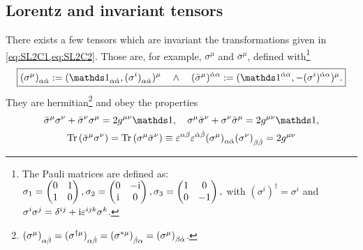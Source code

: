 \subsection{Lorentz and \SLtwoC{} invariant tensors} \label{sec:sigmaRelations}
There exists a few tensors which are invariant \wrt the transformations given in \cref{eq:SL2C1,eq:SL2C2}. Those are, for example, $ \sigma^{\mu} $ and $ \bar{\sigma}^{\mu} $,  defined with\footnote{The Pauli matrices are defined as: $ \sigma_{1} = \begin{pmatrix}
		0 & 1 \\
		1 & 0 
	\end{pmatrix},
	\sigma_{2} = \begin{pmatrix}
		0 & -\mathrm{i} \\
		\mathrm{i} & 0 
	\end{pmatrix},
	\sigma_{3} = \begin{pmatrix}
		1 &  0 \\
		0 & -1 
	\end{pmatrix}, 		
	$ with $ (\sigma^{i})^{\dagger} = \sigma^{i} $ and $ \sigma^{i} \sigma^{j} = \tensor{\delta}{^{ij}} + \mi \tensor{\eps}{^{ijk}} \sigma^{k} $.}
\begin{equation}
	\begin{aligned}
		\boxed{
			\tensor{(\sigma^{\mu})}{_{\alpha \dot{\alpha}}} := (\tensor{\one}{_{\alpha \dot{\alpha}}}, \tensor{(\sigma^{i})}{_{\alpha \dot{\alpha}}})^{\mu}
			\quad \wedge \quad
			\tensor{(\bar{\sigma}^{\mu})}{^{\dot{\alpha} \alpha}} := (\tensor{\one}{^{\dot{\alpha} \alpha}}, -\tensor{(\sigma^{i})}{^{\dot{\alpha} \alpha}})^{\mu} \text{.}}
	\end{aligned}
\end{equation}
They are hermitian\footnote{$ \tensor{(\sigma^{\mu})}{_{\alpha \dot{\beta}}} = \tensor{(\sigma^{\dagger \mu})}{_{\alpha \dot{\beta}}} = \tensor{(\sigma^{* \mu})}{_{\dot{\beta} \alpha}} = \tensor{(\sigma^{\mu})}{_{\beta \dot{\alpha}}} $.} and obey the properties
\begin{gather}
	\bar{\sigma}^{\mu} \sigma^{\nu} + \bar{\sigma}^{\nu} \sigma^{\mu} = 2 \metric^{\mu \nu} \one, \quad
	\sigma^{\mu} \bar{\sigma}^{\nu} + \sigma^{\nu} \bar{\sigma}^{\mu} = 2 \metric^{\mu \nu} \one, \\
	\Tr{\bar{\sigma}^{\mu} \sigma^{\nu}} = \Tr{\sigma^{\mu} \bar{\sigma}^{\nu}} \equiv \eps^{\alpha \beta} \eps^{\dot{\alpha} \dot{\beta}} \tensor{(\sigma^{\mu})}{_{\alpha \dot{\alpha}}} \tensor{(\sigma^{\nu})}{_{\beta \dot{\beta}}} = 2 \metric^{\mu \nu}
\end{gather}
